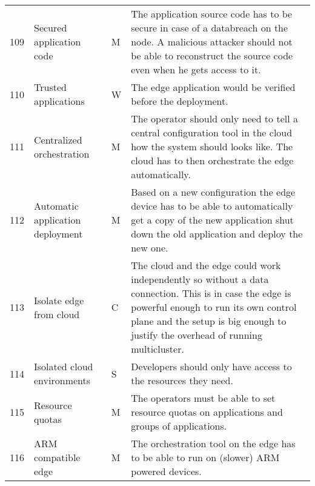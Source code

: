 \begin{longtable}{l p{3.5cm} p{0.8cm} p{12.5cm} }
109                     & Secured application code                & M      & The application source code has to be secure in case of a databreach on the node. A malicious attacker should not be able to reconstruct the source code even when he gets access to it.                                            \\
110                     & Trusted applications                    & W      & The edge application would be verified before the deployment.                                                                                                                                                                       \\
111                     & Centralized orchestration               & M      & The operator should only need to tell a central configuration tool in the cloud how the system should looks like. The cloud has to then orchestrate the edge automatically.                                                         \\
112                     & Automatic application deployment        & M      & Based on a new configuration the edge device has to be able to automatically get a copy of the new application shut down the old application and deploy the new one.                                                                \\
113                     & Isolate edge from cloud                 & C      & The cloud and the edge could work independently so without a data connection. This is in case the edge is powerful enough to run its own control plane and the setup is big enough to justify the overhead of running multicluster. \\
114                     & Isolated cloud environments             & S      & Developers should only have access to the resources they need.                                                                                                                                                                      \\
115                     & Resource quotas                         & M      & The operators must be able to set resource quotas on applications and groups of applications.                                                                                                                                       \\
116                     & ARM compatible edge                     & M      & The orchestration tool on the edge has to be able to run on (slower) ARM powered devices.                                                                                                                                           \\

\end{longtable}
